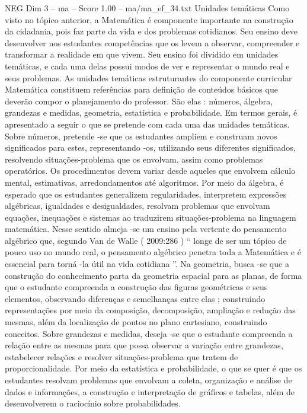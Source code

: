 \begin{textsample}{NEG Dim 3 – ma – Score 1.00 – ma/ma\_ef\_34.txt}  \label{ex:f3_neg_145}
Unidades temáticas Como visto no tópico anterior, a Matemática é componente importante na construção da cidadania, pois faz parte da vida e dos problemas cotidianos.
Seu ensino deve desenvolver nos estudantes competências que os levem a observar, compreender e transformar a realidade em que vivem.
Seu ensino foi dividido em unidades temáticas, e cada uma delas possui modos de ver e representar o mundo real e seus problemas.
As unidades temáticas estruturantes do componente curricular Matemática constituem referências para definição de conteúdos básicos que deverão compor o planejamento do professor.
São elas : números, álgebra, grandezas e medidas, geometria, estatística e probabilidade.
Em termos gerais, é apresentado a seguir o que se pretende com cada uma das unidades temáticas.
Sobre números, pretende -se que os estudantes ampliem e construam novos significados para estes, representando -os, utilizando seus diferentes significados, resolvendo situações-problema que os envolvam, assim como problemas operatórios.
Os procedimentos devem variar desde aqueles que envolvem cálculo mental, estimativas, arredondamentos até algoritmos.
Por meio da álgebra, é esperado que os estudantes generalizem regularidades, interpretem expressões algébricas, igualdades e desigualdades, resolvam problemas que envolvam equações, inequações e sistemas ao traduzirem situações-problema na linguagem matemática.
Nesse sentido almeja -se um ensino pela vertente do pensamento algébrico que, segundo Van de Walle ( 2009:286 ) “ longe de ser um tópico de pouco uso no mundo real, o pensamento algébrico penetra toda a Matemática e é essencial para torná -la útil na vida cotidiana ”.
Na geometria, busca -se que a construção do conhecimento parta da geometria espacial para as planas, de forma que o estudante compreenda a construção das figuras geométricas e seus elementos, observando diferenças e semelhanças entre elas ; construindo representações por meio da composição, decomposição, ampliação e redução das mesmas, além da localização de pontos no plano cartesiano, construindo conceitos.
Sobre grandezas e medidas, deseja -se que o estudante compreenda a relação entre as mesmas para que possa observar a variação entre grandezas, estabelecer relações e resolver situações-problema que tratem de proporcionalidade.
Por meio da estatística e probabilidade, o que se quer é que os estudantes resolvam problemas que envolvam a coleta, organização e análise de dados e informações, a construção e interpretação de gráficos e tabelas, além de desenvolverem o raciocínio sobre probabilidades.

\end{textsample}
